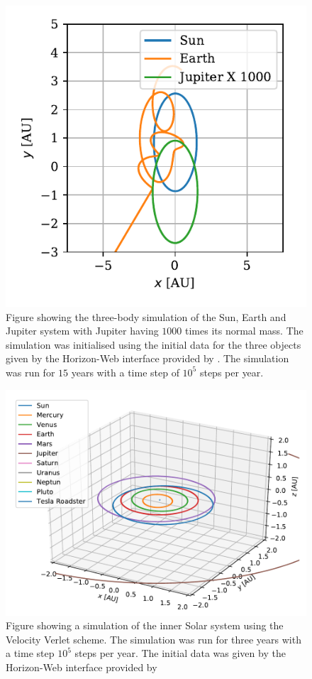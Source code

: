 \documentclass[twocolumn]{aastex62}
\begin{document}
\begin{figure}
\includegraphics[scale=1]{Figures/jupiter1000.pdf}
\caption{Figure showing the three-body simulation of the Sun, Earth and Jupiter system
with Jupiter having $1000$ times its normal mass. The simulation was initialised using the
initial data for the three objects given by the Horizon-Web interface provided by \cite{nasa:2018}. The simulation
was run for $15$ years with a time step of $10^5$ steps per year.}
\label{fig:jupiter1000}
\end{figure}

\begin{figure}
\includegraphics[scale=1]{Figures/InnerSolarSystem.pdf}
\caption{Figure showing a simulation of the inner Solar system using the Velocity Verlet scheme. The simulation was run for three years with a time step $10^5$ steps per year. The initial data was given by the Horizon-Web interface provided by \cite{nasa:2018}}
\label{fig:outer}
\end{figure}
\end{document}
